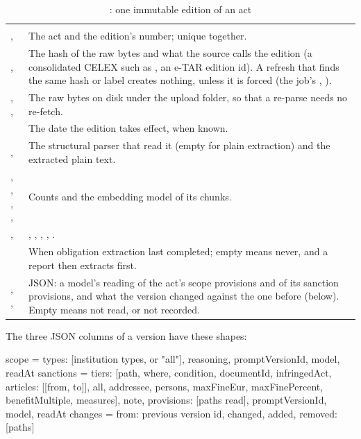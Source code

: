 \begin{xltabular}{\textwidth}{@{}L{38mm}Y@{}}
\caption{: one immutable edition of an act}\label{tab:data:lv}\\
\toprule
{} &  \\
\midrule
\endfirsthead
\toprule
{} &  \\
\midrule
\endhead
\bottomrule
\endlastfoot
{},  & The act and the edition's number; unique together. \\
,  & The hash of the raw bytes and what the source calls the edition (a consolidated CELEX such as , an e-TAR edition id). A refresh that finds the same hash or label creates nothing, unless it is forced (the job's , ). \\
, ,  & The raw bytes on disk under the upload folder, so that a re-parse needs no re-fetch. \\
 & The date the edition takes effect, when known. \\
,  & The structural parser that read it (empty for plain extraction) and the extracted plain text. \\
, , , ,  & Counts and the embedding model of its chunks. \\
,  & , , , , . \\
 & When obligation extraction last completed; empty means never, and a report then extracts first. \\
, ,  & JSON: a model's reading of the act's scope provisions and of its sanction provisions, and what the version changed against the one before (below). Empty means not read, or not recorded. \\
\end{xltabular}

The three JSON columns of a version have these shapes:

\begin{codeblock}
scope     = {types: [institution types, or "all"], reasoning,
             promptVersionId, model, readAt}
sanctions = {tiers: [{path, where, condition, documentId, infringedAct,
                      articles: [[from, to]], all, addressee, persons,
                      maxFineEur, maxFinePercent, benefitMultiple, measures}],
             note, provisions: [paths read], promptVersionId, model, readAt}
changes   = {from: previous version id, changed, added, removed: [paths]}
\end{codeblock}

